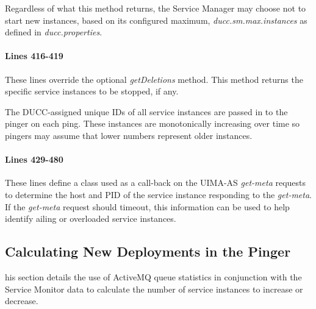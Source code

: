     Regardless of what this method returns, the Service Manager may choose
    not to start new instances, based on its configured maximum,
    {\em ducc.sm.max.instances} as defined in {\em ducc.properties}.

    \paragraph{Lines 416-419}
    These lines override the optional {\em getDeletions} method.  This
    method returns the specific service instances to be stopped, if any.
    
    The DUCC-assigned unique IDs of all service instances are passed in to
    the pinger on each ping.  These instances are monotonically increasing
    over time so pingers may assume that lower numbers represent older
    instances.


    \paragraph{Lines 429-480}
    These lines define a class used as a call-back on the UIMA-AS
    {\em get-meta} requests to determine the host and PID of the
    service instance responding to the {\em get-meta}.   If the
    {\em get-meta} request should timeout, this information can be used to
    help identify ailing or overloaded service instances.
    
    \subsection{Calculating New Deployments in the Pinger}
    \label{subsec:services.calculate-new}

    his section details the use of ActiveMQ queue statistics
    in conjunction with the Service Monitor data to calculate the number
    of service instances to increase or decrease.

